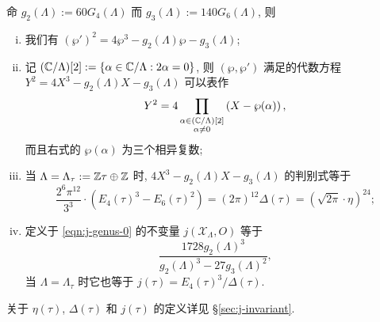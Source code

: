 \begin{theorem}\label{prop:wp-equations}
	   
	命 $g_2(\Lambda) := 60 G_4(\Lambda)$ 而 $g_3(\Lambda) := 140 G_6(\Lambda)$, 则
	\begin{enumerate}[(i)]
		\item 我们有 $(\wp')^2 = 4\wp^3 - g_2(\Lambda) \wp - g_3(\Lambda)$;
		\item 记 $(\mathbb{C}/\Lambda)[2] := \{ \alpha \in \mathbb{C}/\Lambda: 2\alpha = 0 \}$, 则 $(\wp, \wp')$ 满足的代数方程 $Y^2 = 4X^3 - g_2(\Lambda) X - g_3(\Lambda)$ 可以表作
			\[ Y^2 = 4 \prod_{\substack{\alpha \in (\mathbb{C}/\Lambda)[2] \\ \alpha \neq 0}} \left( X - \wp(\alpha) \right), \]
			而且右式的 $\wp(\alpha)$ 为三个相异复数;
		\item 当 $\Lambda = \Lambda_\tau := \mathbb{Z}\tau \oplus \mathbb{Z}$ 时, $4X^3 - g_2(\Lambda) X - g_3(\Lambda)$ 的判别式等于
			\[ \dfrac{2^6 \pi^{12}}{3^3} \cdot \left( E_4(\tau)^3 - E_6(\tau)^2 \right) = (2\pi)^{12} \Delta(\tau) = \left( \sqrt{2\pi} \cdot \eta \right)^{24}; \]
		\item 定义于 \eqref{eqn:j-genus-0} 的不变量 $j(\mathcal{X}_\Lambda, O)$ 等于
			\[ \dfrac{1728 g_2(\Lambda)^3}{ g_2(\Lambda)^3 - 27 g_3(\Lambda)^2 }, \]
			当 $\Lambda = \Lambda_\tau$ 时它也等于 $j(\tau) = E_4(\tau)^3/\Delta(\tau)$.
	\end{enumerate}

	关于 $\eta(\tau)$, $\Delta(\tau)$ 和 $j(\tau)$ 的定义详见 \S\ref{sec:j-invariant}.
\end{theorem}
